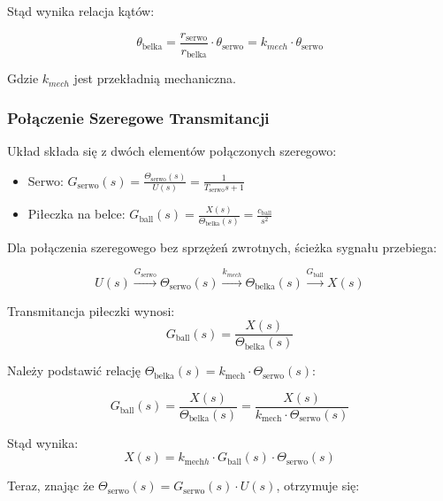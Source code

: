 Stąd wynika relacja kątów:

\begin{equation}
\theta_{\mathrm{belka}} = \frac{r_{\mathrm{serwo}}}{r_{\mathrm{belka}}} \cdot \theta_{\mathrm{serwo}} = k_{mech} \cdot \theta_{\mathrm{serwo}}
\end{equation}

Gdzie $k_{mech}$ jest przekładnią mechaniczna.

\subsubsection{Połączenie Szeregowe Transmitancji}

Układ składa się z dwóch elementów połączonych szeregowo:
\begin{itemize}
  \item Serwo: $G_{\mathrm{serwo}}(s) = \frac{\Theta_{\mathrm{serwo}}(s)}{U(s)} = \frac{1}{T_{\mathrm{serwo}} s + 1}$
  \item Piłeczka na belce: $G_{\mathrm{ball}}(s) = \frac{X(s)}{\Theta_{\mathrm{belka}}(s)} = \frac{c_{\mathrm{ball}}}{s^2}$
\end{itemize}

Dla połączenia szeregowego bez sprzężeń zwrotnych, ścieżka sygnału przebiega:

\begin{equation}
U(s) \xrightarrow{G_{\mathrm{serwo}}} \Theta_{\mathrm{serwo}}(s) \xrightarrow{k_{mech}} \Theta_{\mathrm{belka}}(s) \xrightarrow{G_{\mathrm{ball}}} X(s)
\end{equation}

Transmitancja piłeczki wynosi:
\begin{equation}
G_{\mathrm{ball}}(s) = \frac{X(s)}{\Theta_{\mathrm{belka}}(s)}
\end{equation}

 Należy podstawić 
relację $\Theta_{\mathrm{belka}}(s) = k_{\mathrm{mech}} \cdot \Theta_{\mathrm{serwo}}(s)$:

\begin{equation}
G_{\mathrm{ball}}(s) = \frac{X(s)}{\Theta_{\mathrm{belka}}(s)} = \frac{X(s)}{k_{\mathrm{mech}} \cdot \Theta_{\mathrm{serwo}}(s)} 
\end{equation}

Stąd wynika:
\begin{equation}
X(s) = k_{\mathrm{mech}h} \cdot G_{\mathrm{ball}}(s) \cdot \Theta_{\mathrm{serwo}}(s)
\end{equation}

Teraz, znając że $\Theta_{\mathrm{serwo}}(s) = G_{\mathrm{serwo}}(s) \cdot U(s)$, otrzymuje się:

